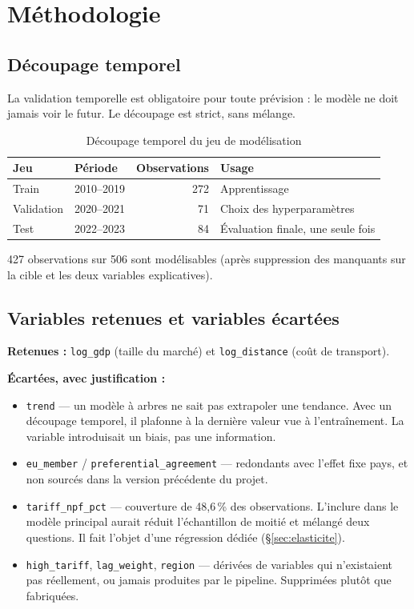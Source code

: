 \documentclass[11pt,a4paper]{article}
\begin{document}
\section{Méthodologie}\label{sec:method}

\subsection{Découpage temporel}

La validation temporelle est obligatoire pour toute prévision : le modèle ne doit
jamais voir le futur. Le découpage est strict, sans mélange.

\begin{table}[H]
\centering
\caption{Découpage temporel du jeu de modélisation}\label{tab:split}
\begin{tabular}{llrl}
\toprule
\textbf{Jeu} & \textbf{Période} & \textbf{Observations} & \textbf{Usage} \\
\midrule
Train & 2010--2019 & 272 & Apprentissage \\
Validation & 2020--2021 & 71 & Choix des hyperparamètres \\
Test & 2022--2023 & 84 & Évaluation finale, une seule fois \\
\bottomrule
\end{tabular}
\end{table}

427 observations sur 506 sont modélisables (après suppression des manquants sur la
cible et les deux variables explicatives).

\subsection{Variables retenues et variables écartées}

\textbf{Retenues :} \texttt{log\_gdp} (taille du marché) et \texttt{log\_distance}
(coût de transport).

\textbf{Écartées, avec justification :}

\begin{itemize}[leftmargin=1.2cm]
    \item \texttt{trend} — un modèle à arbres ne sait pas extrapoler une tendance.
          Avec un découpage temporel, il plafonne à la dernière valeur vue à
          l'entraînement. La variable introduisait un biais, pas une information.
    \item \texttt{eu\_member} / \texttt{preferential\_agreement} — redondants avec
          l'effet fixe pays, et non sourcés dans la version précédente du projet.
    \item \texttt{tariff\_npf\_pct} — couverture de 48,6\,\% des observations.
          L'inclure dans le modèle principal aurait réduit l'échantillon de moitié et
          mélangé deux questions. Il fait l'objet d'une régression dédiée
          (§\ref{sec:elasticite}).
    \item \texttt{high\_tariff}, \texttt{lag\_weight}, \texttt{region} — dérivées de
          variables qui n'existaient pas réellement, ou jamais produites par le
          pipeline. Supprimées plutôt que fabriquées.
\end{itemize}
\end{document}
